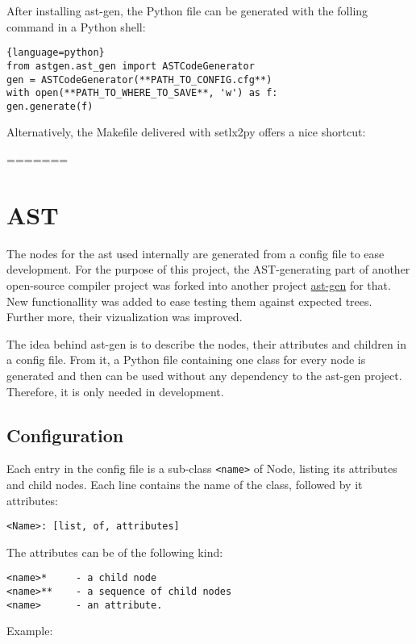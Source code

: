 After installing ast-gen, the Python file can be generated with the folling command in a Python shell:

\begin{lstlisting}{language=python}
from astgen.ast_gen import ASTCodeGenerator
gen = ASTCodeGenerator(**PATH_TO_CONFIG.cfg**)
with open(**PATH_TO_WHERE_TO_SAVE**, 'w') as f:
gen.generate(f)
\end{lstlisting}

Alternatively, the Makefile delivered with setlx2py offers a nice shortcut:

=======

\section{AST}
\label{sec:ast}


The nodes for the \gls{ast} used  internally are generated from a config file to ease development. For the purpose of this project, the AST-generating part of another open-source compiler project  was forked into another project \url{ast-gen} for that. New functionallity was added to ease testing them against expected trees.  Further more, their vizualization was improved.

The idea behind ast-gen is to describe the nodes, their attributes and children in a config file. From it, a Python file containing one class for every node is generated and then can be used without any dependency to the ast-gen project. Therefore, it is only needed in development.

\subsection{Configuration}

Each entry in the config file is a sub-class \texttt{<name>} of Node, listing its attributes and child nodes. Each line contains the name of the class, followed by it attributes:

\verb$<Name>: [list, of, attributes]$

The attributes can be of the following kind:

\begin{verbatim}
<name>*     - a child node
<name>**    - a sequence of child nodes
<name>      - an attribute.
\end{verbatim}

Example:

